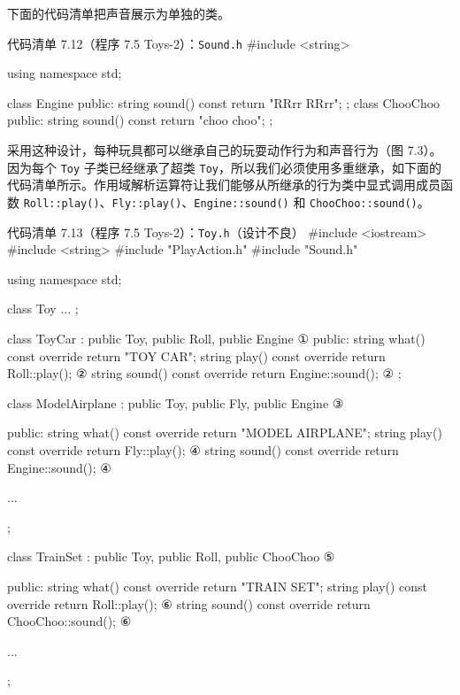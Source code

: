 下面的代码清单把声音展示为单独的类。

\begin{codeboxt}{代码清单 7.12（程序 7.5 Toys-2）：\texttt{Sound.h}}
#include <string>

using namespace std;

class Engine
{
public:
    string sound() const { return "RRrr RRrr"; }
};
class ChooChoo
{
public:
    string sound() const { return "choo choo"; }
};
\end{codeboxt}

采用这种设计，每种玩具都可以继承自己的玩耍动作行为和声音行为（图 7.3）。因为每个 \texttt{Toy} 子类已经继承了超类 \texttt{Toy}，所以我们必须使用多重继承，如下面的代码清单所示。作用域解析运算符让我们能够从所继承的行为类中显式调用成员函数 \texttt{Roll::\allowbreak{}play(\allowbreak{})\allowbreak{}}、\texttt{Fly::\allowbreak{}play(\allowbreak{})\allowbreak{}}、\texttt{Engine::\allowbreak{}sound(\allowbreak{})\allowbreak{}} 和 \texttt{Choo\allowbreak{}Choo::\allowbreak{}sound(\allowbreak{})\allowbreak{}}。

\begin{codeboxt}{代码清单 7.13（程序 7.5 Toys-2）：\texttt{Toy.h}（设计不良）}
#include <iostream>
#include <string>
#include "PlayAction.h"
#include "Sound.h"

using namespace std;

class Toy
{
    ...
};

class ToyCar : public Toy, public Roll, public Engine           ①
{
public:
    string what()  const override { return "TOY CAR"; }
    string play()  const override { return Roll::play(); }      ②
    string sound() const override { return Engine::sound(); }   ②
};

class ModelAirplane : public Toy, public Fly, public Engine     ③
{
public:
    string what()  const override { return "MODEL AIRPLANE"; }
    string play()  const override { return Fly::play(); }       ④
    string sound() const override { return Engine::sound(); }   ④

    ...
};

class TrainSet : public Toy, public Roll, public ChooChoo       ⑤
{
public:
    string what()  const override { return "TRAIN SET"; }
    string play()  const override { return Roll::play(); }      ⑥
    string sound() const override { return ChooChoo::sound(); } ⑥

    ...
};
\end{codeboxt}
\par
{}\par
{}\par
{}\par
{}\par
{}\par

